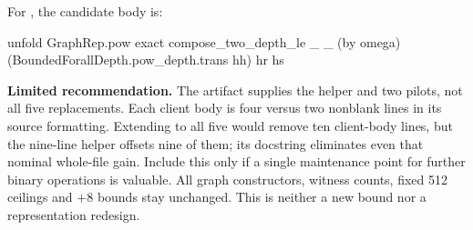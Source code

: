 For , the candidate body is:
\begin{Lean}
  unfold GraphRep.pow
  exact compose_two_depth_le _ _ (by omega)
    (BoundedForallDepth.pow_depth.trans hh) hr hs
\end{Lean}

\textbf{Limited recommendation.} The artifact supplies the helper and two
pilots, not all five replacements. Each client body is four versus two
nonblank lines in its source formatting. Extending to all five would remove
ten client-body lines, but the nine-line helper offsets nine of them; its
docstring eliminates even that nominal whole-file gain. Include this only
if a single maintenance point for further binary operations is valuable.
All graph constructors, witness counts, fixed 512 ceilings and $+8$ bounds
stay unchanged. This is neither a new bound nor a representation redesign.
